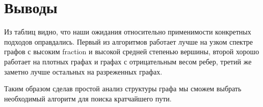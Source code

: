 \FloatBarrier
\section{Выводы}

Из таблиц видно, что наши ожидания относительно применимости конкретных подходов оправдались. Первый из алгоритмов работает лучше на узком спектре графов с высоким fraction и высокой средней степенью вершины, второй хорошо работает на плотных графах и графах с отрицательным весом ребер, третий же заметно лучше остальных на разреженных графах.

Таким образом сделав простой анализ структуры графа мы сможем выбрать необходимый алгоритм для поиска кратчайшего пути. 
\FloatBarrier
